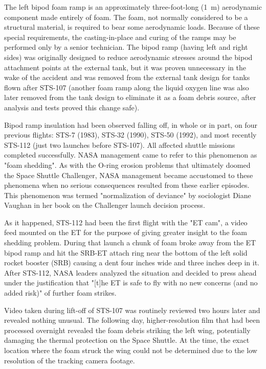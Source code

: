 The left bipod foam ramp is an approximately three-foot-long (1~m)
aerodynamic component made entirely of foam. The foam, not normally
considered to be a structural material, is required to bear some
aerodynamic loads. Because of these special requirements, the
casting-in-place and curing of the ramps may be performed only by a
senior technician. The bipod ramp (having left and right sides) was
originally designed to reduce aerodynamic stresses around the bipod
attachment points at the external tank, but it was proven unnecessary in
the wake of the accident and was removed from the external tank design
for tanks flown after STS-107 (another foam ramp along the liquid oxygen
line was also later removed from the tank design to eliminate it as a
foam debris source, after analysis and tests proved this change safe).

Bipod ramp insulation had been observed falling off, in whole or in
part, on four previous flights: STS-7 (1983), STS-32 (1990), STS-50
(1992), and most recently STS-112 (just two launches before STS-107).
All affected shuttle missions completed successfully. NASA management
came to refer to this phenomenon as "foam shedding". As with the O-ring
erosion problems that ultimately doomed the Space Shuttle Challenger,
NASA management became accustomed to these phenomena when no serious
consequences resulted from these earlier episodes. This phenomenon was
termed "normalization of deviance" by sociologist Diane Vaughan in her
book on the Challenger launch decision process.

As it happened, STS-112 had been the first flight with the "ET cam", a
video feed mounted on the ET for the purpose of giving greater insight
to the foam shedding problem. During that launch a chunk of foam broke
away from the ET bipod ramp and hit the SRB-ET attach ring near the
bottom of the left solid rocket booster (SRB) causing a dent four inches
wide and three inches deep in it. After STS-112, NASA leaders analyzed
the situation and decided to press ahead under the justification that
"{[}t{]}he ET is safe to fly with no new concerns (and no added risk)"
of further foam strikes.

Video taken during lift-off of STS-107 was routinely reviewed two hours
later and revealed nothing unusual. The following day, higher-resolution
film that had been processed overnight revealed the foam debris striking
the left wing, potentially damaging the thermal protection on the Space
Shuttle. At the time, the exact location where the foam struck the wing
could not be determined due to the low resolution of the tracking camera
footage.

